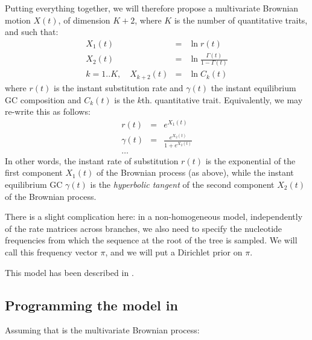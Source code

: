 Putting everything together, we will therefore propose a multivariate Brownian motion $X(t)$, of dimension $K+2$, where $K$ is the number of quantitative traits, and such that:
\begin{eqnarray*}
X_1(t) &=& \ln r(t)
\\
X_2(t) &=& \ln \frac{\Gamma(t)}{1 - \Gamma(t)}
\\
k=1..K, \quad X_{k+2}(t) &=& \ln C_k(t)
\end{eqnarray*}
where $r(t)$ is the instant substitution rate and $\gamma(t)$ the instant equilibrium GC composition
and $C_k(t)$ is the $k$th. quantitative trait.
Equivalently, we may re-write this as follows:
\begin{eqnarray*}
r(t) &=& e^{X_1(t)}
\\
\gamma(t) &=& \frac{e^{X_2(t)}}{1 + e^{X_2(t)}}
\\
\ldots
\end{eqnarray*}
In other words, the instant rate of substitution $r(t)$ is the exponential of the first component $X_1(t)$ of the Brownian process (as above), while the instant equilibrium GC $\gamma(t)$ is the \emph{hyperbolic tangent} of the second component $X_2(t)$ of the Brownian process.

There is a slight complication here: in a non-homogeneous model, independently of the rate matrices across branches, we also need to specify the nucleotide frequencies from which the sequence at the root of the tree is sampled. We will call this frequency vector $\pi$, and we will put a Dirichlet prior on $\pi$.

This model has been described in \cite{Lartillot2013}.

\subsection*{Programming the model in \RevBayes}

Assuming that  is the multivariate Brownian process:


